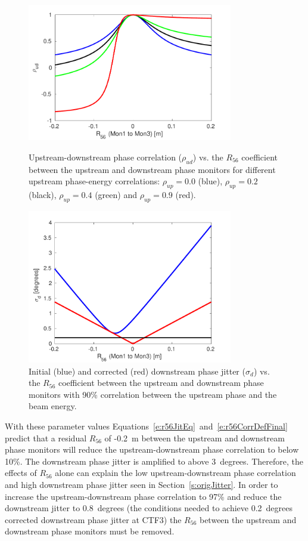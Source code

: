 \begin{figure}
  \centering
  \includegraphics[width=0.8\textwidth]{Figures/propagation/corrVsR56_CTENCorr}
  \caption{Upstream-downstream phase correlation (\(\rho_{ud}\)) vs. the \(R_{56}\) coefficient between the upstream and downstream phase monitors for different upstream phase-energy correlations: \(\rho_{up}=0.0\) (blue), \(\rho_{up}=0.2\) (black), \(\rho_{up}=0.4\) (green) and \(\rho_{up}=0.9\) (red).}
  \label{f:corrVsR56_CTENCorr}
  \includegraphics[width=0.8\textwidth]{Figures/propagation/jitVsR56_90ctencorr}
  \caption{Initial (blue) and corrected (red) downstream phase jitter (\(\sigma_d\)) vs. the \(R_{56}\) coefficient between the upstream and downstream phase monitors with 90\% correlation between the upstream phase and the beam energy.}
  \label{f:jitVsR56_90ctencorr}
\end{figure}

With these parameter values Equations~\ref{e:r56JitEq}~and~\ref{e:r56CorrDefFinal} predict that a residual \(R_{56}\) of -0.2~m between the upstream and downstream phase monitors will reduce the upstream-downstream phase correlation to below 10\%. The downstream phase jitter is amplified to above 3~degrees. Therefore, the effects of \(R_{56}\) alone can explain the low upstream-downstream phase correlation and high downstream phase jitter seen in Section~\ref{s:origJitter}. In order to increase the upstream-downstream phase correlation to 97\% and reduce the downstream jitter to 0.8~degrees (the conditions needed to achieve 0.2~degrees corrected downstream phase jitter at CTF3) the \(R_{56}\) between the upstream and downstream phase monitors must be removed.

